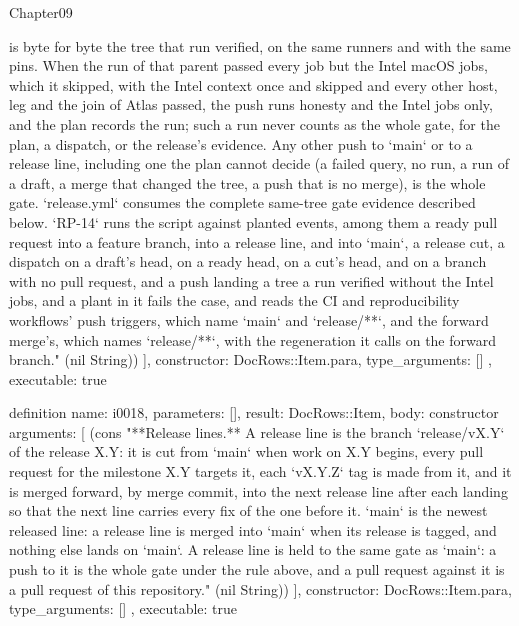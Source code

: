 \begin{lexlean}{Chapter09}
\begin{semanticmodule}
{{is byte for byte the tree that run verified, on the same runners and with the same pins. When the run of that parent passed every job but the Intel macOS jobs, which it skipped, with the Intel context once and skipped and every other host, leg and the join of Atlas passed, the push runs honesty and the Intel jobs only, and the plan records the run; such a run never counts as the whole gate, for the plan, a dispatch, or the release's evidence. Any other push to `main` or to a release line, including one the plan cannot decide (a failed query, no run, a run of a draft, a merge that changed the tree, a push that is no merge), is the whole gate. `release.yml` consumes the complete same-tree gate evidence described below. `RP-14` runs the script against planted events, among them a ready pull request into a feature branch, into a release line, and into `main`, a release cut, a dispatch on a draft's head, on a ready head, on a cut's head, and on a branch with no pull request, and a push landing a tree a run verified without the Intel jobs, and a plant in it fails the case, and reads the CI and reproducibility workflows' push triggers, which name `main` and `release/**`, and the forward merge's, which names `release/**`, with the regeneration it calls on the forward branch." (nil String))
    ],
    constructor: DocRows::Item.para,
    type_arguments: []
  },
  executable: true
}

definition{
  name: i0018,
  parameters: [],
  result: DocRows::Item,
  body: constructor{
    arguments: [
      (cons "**Release lines.** A release line is the branch `release/vX.Y` of the release X.Y: it is cut from `main` when work on X.Y begins, every pull request for the milestone X.Y targets it, each `vX.Y.Z` tag is made from it, and it is merged forward, by merge commit, into the next release line after each landing so that the next line carries every fix of the one before it. `main` is the newest released line: a release line is merged into `main` when its release is tagged, and nothing else lands on `main`. A release line is held to the same gate as `main`: a push to it is the whole gate under the rule above, and a pull request against it is a pull request of this repository." (nil String))
    ],
    constructor: DocRows::Item.para,
    type_arguments: []
  },
  executable: true
}


\end{semanticmodule}
\end{lexlean}
